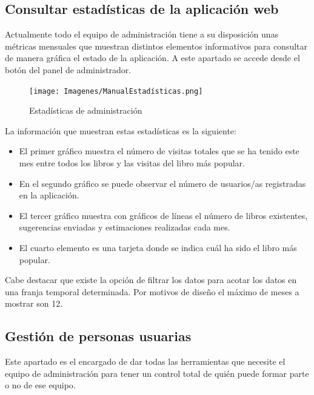 \subsection{Consultar estadísticas de la aplicación web}
Actualmente todo el equipo de administración tiene a su disposición unas métricas mensuales que muestran distintos elementos informativos para consultar de manera gráfica el estado de la aplicación.
A este apartado se accede desde el botón del panel de administrador.
\begin{figure}
    \centering
    \texttt{[image: Imagenes/ManualEstadísticas.png]}
    \caption{Estadísticas de administración}
    \label{Estadísticas de administración}
\end{figure}

La información que muestran estas estadísticas es la siguiente:
\begin{itemize}
    \item El primer gráfico muestra el número de visitas totales que se ha tenido este mes entre todos los libros y las visitas del libro más popular.
    \item En el segundo gráfico se puede observar el número de usuarios/as registradas en la aplicación.
    \item El tercer gráfico muestra con gráficos de líneas el número de libros existentes, sugerencias enviadas y estimaciones realizadas cada mes.
    \item El cuarto elemento es una tarjeta donde se indica cuál ha sido el libro más popular.
    \items
\end{itemize}
Cabe destacar que existe la opción de filtrar los datos para acotar los datos en una franja temporal determinada. Por motivos de diseño el máximo de meses a mostrar son 12.

\subsection{Gestión de personas usuarias}
Este apartado es el encargado de dar todas las herramientas que necesite el equipo de administración para tener un control total de quién puede formar parte o no de ese equipo.

